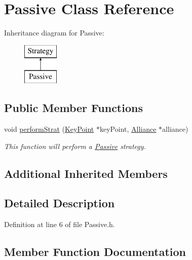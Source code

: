 \hypertarget{classPassive}{}\section{Passive Class Reference}
\label{classPassive}
Inheritance diagram for Passive\+:\begin{figure}[H]
\begin{center}
\leavevmode
\includegraphics[height=2.000000cm]{classPassive}
\end{center}
\end{figure}
\subsection*{Public Member Functions}
\begin{DoxyCompactItemize}
\item 
void \hyperlink{classPassive_ab296d4f8ba8ad68dacef1f80e3041aa7}{perform\+Strat} (\hyperlink{classKeyPoint}{Key\+Point} $\ast$key\+Point, \hyperlink{classAlliance}{Alliance} $\ast$alliance)
\begin{DoxyCompactList}\small\item\em This function will perform a \hyperlink{classPassive}{Passive} strategy. \end{DoxyCompactList}\end{DoxyCompactItemize}
\subsection*{Additional Inherited Members}


\subsection{Detailed Description}


Definition at line 6 of file Passive.\+h.



\subsection{Member Function Documentation}
\mbox{\label{classPassive_ab296d4f8ba8ad68dacef1f80e3041aa7}} 
